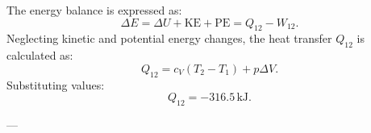 The energy balance is expressed as:  
\[
\Delta E = \Delta U + \text{KE} + \text{PE} = Q_{12} - W_{12}.
\]  
Neglecting kinetic and potential energy changes, the heat transfer \( Q_{12} \) is calculated as:  
\[
Q_{12} = c_V (T_2 - T_1) + p \Delta V.
\]  
Substituting values:  
\[
Q_{12} = -316.5 \, \text{kJ}.
\]

---